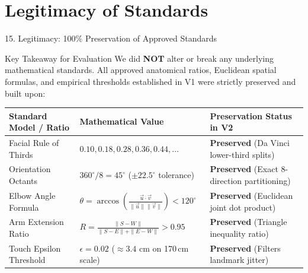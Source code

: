 \documentclass[aspectratio=169]{beamer}
\begin{document}
\section{Legitimacy of Standards}
\begin{frame}{15. Legitimacy: 100\% Preservation of Approved Standards}
    \vspace{2mm}
    
    \begin{block}{Key Takeaway for Evaluation}
        \small
        We did \textbf{NOT} alter or break any underlying mathematical standards. All approved anatomical ratios, Euclidean spatial formulas, and empirical thresholds established in V1 were strictly preserved and built upon:
    \end{block}
    
    \vspace{3mm}
    
    \begin{table}
        \centering
        \scriptsize
        \renewcommand{\arraystretch}{1.5} %
        \begin{tabular}{| p{3.2cm} | p{4.3cm} | p{4.5cm} |}
            \hline
            \textbf{Standard Model / Ratio} & \textbf{Mathematical Value} & \textbf{Preservation Status in V2} \\ \hline
            
            Facial Rule of Thirds & 
            $0.10, 0.18, 0.28, 0.36, 0.44, \dots$ & 
            \textbf{Preserved} (Da Vinci lower-third splits) \\ \hline
            
            Orientation Octants & 
            $360^\circ / 8 = 45^\circ$ ($\pm 22.5^\circ$ tolerance) & 
            \textbf{Preserved} (Exact 8-direction partitioning) \\ \hline
            
            Elbow Angle Formula & 
            $\theta = \arccos \left( \frac{\vec{u} \cdot \vec{v}}{\|\vec{u}\|\|\vec{v}\|} \right) < 120^\circ$ & 
            \textbf{Preserved} (Euclidean joint dot product) \\ \hline
            
            Arm Extension Ratio & 
            $R = \frac{\|S - W\|}{\|S - E\| + \|E - W\|} > 0.95$ & 
            \textbf{Preserved} (Triangle inequality ratio) \\ \hline
            
            Touch Epsilon Threshold & 
            $\epsilon = 0.02$ ($\approx 3.4$ cm on 170\,cm scale) & 
            \textbf{Preserved} (Filters landmark jitter) \\ \hline
        \end{tabular}
    \end{table}
\end{frame}
\end{document}

